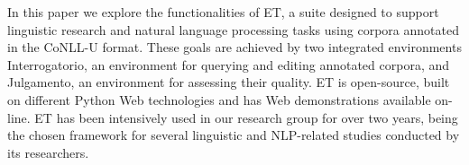 In this paper we explore the functionalities of ET, a suite designed to support linguistic research and natural language processing tasks using corpora annotated in the CoNLL-U format. These goals are achieved by two integrated environments  Interrogatorio, an environment for querying and editing annotated corpora, and Julgamento, an environment for assessing their quality. ET is open-source, built on different Python Web technologies and has Web demonstrations available on-line. ET has been intensively used in our research group for over two years, being the chosen framework for several linguistic and NLP-related studies conducted by its researchers.